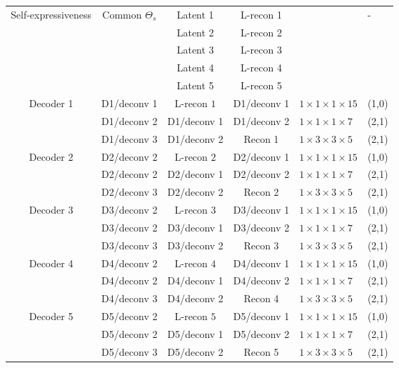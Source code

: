 \documentclass[journal]{IEEEtran}
\begin{document}
\begin{table}[htp!]
{\begin{tabular}{|c|c|c|c|l|  p{0.7cm}|}
			
			\multirow{5}{*}{Self-expressiveness}  & \multirow{5}{*}{Common $\Theta_s$} &  Latent 1   & L-recon 1  & \centering \multirow{5}{*}{$4665600$ Parameters} & \multirow{5}{*}{-} \\
			\multirow{5}{*}{layer}&   &  Latent 2 &  L-recon 2  &    &   \\
			&   &  Latent 3 &  L-recon 3  &    &   \\
			&   &  Latent 4 &  L-recon 4  &    &   \\
			&   &  Latent 5 &  L-recon 5  &    &   \\	
\hline\hline	
			\multirow{3}{*}{Decoder 1}  & D1/deconv 1 &  L-recon $1$  & D1/deconv 1  & $1\times1\times1\times15$  & (1,0) \\
			&    D1/deconv 2 &  D1/deconv 1  & D1/deconv 2  &  $1\times1\times1\times7$ & (2,1) \\			
			&    D1/deconv 3 &  D1/deconv 2  & Recon 1  &  $1\times3\times3\times5$ & (2,1) \\	
			\hline\hline
			\multirow{3}{*}{Decoder 2}  & D2/deconv 2 &  L-recon $2$  & D2/deconv 1  & $1\times1\times1\times15$  & (1,0) \\
			&    D2/deconv 2 &  D2/deconv 1  & D2/deconv 2  &  $1\times1\times1\times7$ & (2,1) \\			
			&    D2/deconv 3 &  D2/deconv 2  & Recon 2  &  $1\times3\times3\times5$ & (2,1) \\	
			\hline\hline
			\multirow{3}{*}{Decoder 3}  & D3/deconv 2 &  L-recon $3$  & D3/deconv 1  & $1\times1\times1\times15$  & (1,0) \\
			&    D3/deconv 2 &  D3/deconv 1  & D3/deconv 2  &  $1\times1\times1\times7$ & (2,1) \\			
			&    D3/deconv 3 &  D3/deconv 2  & Recon 3  &  $1\times3\times3\times5$ & (2,1) \\	
			\hline\hline
			\multirow{3}{*}{Decoder 4}  & D4/deconv 2 &  L-recon $4$  & D4/deconv 1  & $1\times1\times1\times15$  & (1,0) \\
			&    D4/deconv 2 &  D4/deconv 1  & D4/deconv 2  &  $1\times1\times1\times7$ & (2,1) \\			
			&    D4/deconv 3 &  D4/deconv 2  & Recon 4 &  $1\times3\times3\times5$ & (2,1) \\	
			\hline\hline
			\multirow{3}{*}{Decoder 5}  & D5/deconv 2 &  L-recon $5$  & D5/deconv 1  & $1\times1\times1\times15$  & (1,0) \\
			&    D5/deconv 2 &  D5/deconv 1  & D5/deconv 2  &  $1\times1\times1\times7$ & (2,1) \\			
			&    D5/deconv 3 &  D5/deconv 2  & Recon 5 &  $1\times3\times3\times5$ & (2,1) \\	
			\hline
			
		\end{tabular} 
	}
\end{table}
\end{document}

